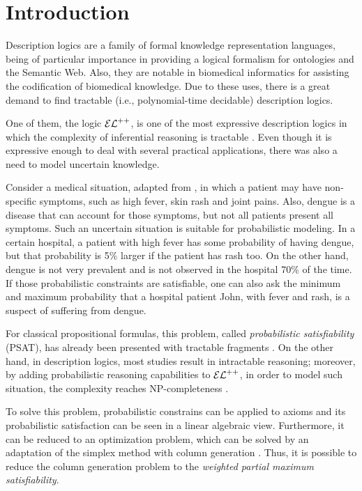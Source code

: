 
\chapter{Introduction}
\label{cap:introduction}

Description logics are a family of formal knowledge representation languages, being of particular importance in providing a logical formalism for ontologies and the Semantic Web. Also, they are notable in biomedical informatics for assisting the codification of biomedical knowledge. Due to these uses, there is a great demand to find tractable (i.e., polynomial-time decidable) description logics.

One of them, the logic $\mathcal{EL}^{++}$, is one of the most expressive description logics in which the complexity of inferential reasoning is tractable \citep{Baader2005a}. Even though it is expressive enough to deal with several practical applications, there was also a need to model uncertain knowledge.

Consider a medical situation, adapted from \citep{Fin2019b}, in which a patient may have non-specific symptoms, such as high fever, skin rash and joint pains. Also, dengue is a disease that can account for those symptoms, but not all patients present all symptoms. Such an uncertain situation is suitable for probabilistic modeling.
In a certain hospital, a patient with high fever has some probability of having dengue, but that probability is 5\% larger if the patient has rash too. On the other hand, dengue is not very prevalent and is not observed in the hospital 70\% of the time. If those probabilistic constraints are satisfiable, one can also ask the minimum and maximum probability that a hospital patient John, with fever and rash, is a suspect of suffering from dengue.

For classical propositional formulas, this problem, called \emph{probabilistic satisfiability} (PSAT), has already been presented with tractable fragments \citep{andersen2001easy}. On the other hand, in description logics, most studies result in intractable reasoning; moreover, by adding probabilistic reasoning capabilities to $\mathcal{EL}^{++}$, in order to model such situation, the complexity reaches NP-completeness \citep{Fin2019b}.

To solve this problem, probabilistic constrains can be applied to axioms and its probabilistic satisfaction can be seen in a linear algebraic view. Furthermore, it can be reduced to an optimization problem, which can be solved by an adaptation of the simplex method with column generation \citep{Fin2019b}. Thus, it is possible to reduce the column generation problem to the \emph{weighted partial maximum satisfiability}.

